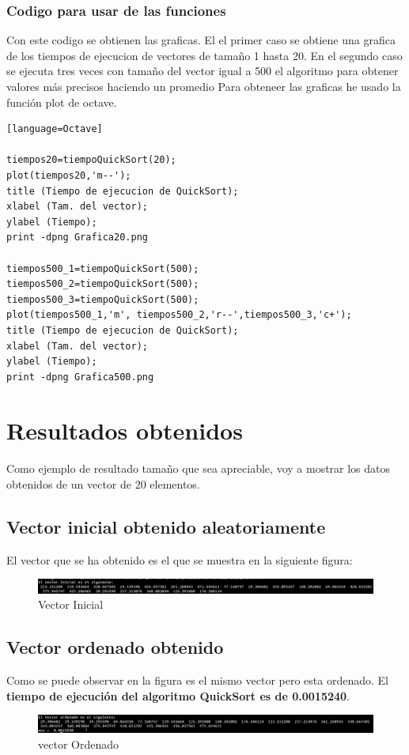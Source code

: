 \documentclass[a4,12pt]{article}
\begin{document}
\subsubsection{Codigo para usar de las funciones}
Con este codigo se obtienen las graficas. El el primer caso se obtiene una grafica de los tiempos de ejecucion de vectores de tamaño 1 hasta 20. En el segundo caso se ejecuta tres veces con tamaño del vector igual a 500 el algoritmo  para obtener valores más precisos haciendo un promedio
Para obteneer las graficas he usado la función plot de octave.
\bigskip %
\lstset{language=Octave}
\begin{lstlisting}[frame=single][language=Octave]

tiempos20=tiempoQuickSort(20);
plot(tiempos20,'m--');
title (Tiempo de ejecucion de QuickSort);
xlabel (Tam. del vector);
ylabel (Tiempo);
print -dpng Grafica20.png 

tiempos500_1=tiempoQuickSort(500);
tiempos500_2=tiempoQuickSort(500);
tiempos500_3=tiempoQuickSort(500);
plot(tiempos500_1,'m', tiempos500_2,'r--',tiempos500_3,'c+');
title (Tiempo de ejecucion de QuickSort);
xlabel (Tam. del vector);
ylabel (Tiempo);
print -dpng Grafica500.png 
\end{lstlisting}
\newpage
\section{Resultados obtenidos}
Como ejemplo de resultado tamaño que sea apreciable, voy a mostrar los datos obtenidos de un vector de 20 elementos.
\subsection{Vector inicial obtenido aleatoriamente}
El vector que se ha obtenido es el que se muestra en la siguiente figura:
\begin{figure}[h]
\includegraphics[width=1\textwidth]{Graficos/vectorInicial}
\caption{Vector Inicial}
\label{fig:vectorInicial}
\end{figure}

\subsection{Vector ordenado obtenido}
Como se puede observar en la figura es el mismo vector pero esta ordenado. 
El \textbf{tiempo de ejecución del algoritmo QuickSort es de 0.0015240}.
\begin{figure}[h]
\includegraphics[width=1\textwidth]{Graficos/vectorOrdenado}
\caption{vector Ordenado}
\label{fig:vectorOrdenado}
\end{figure}
\end{document}
